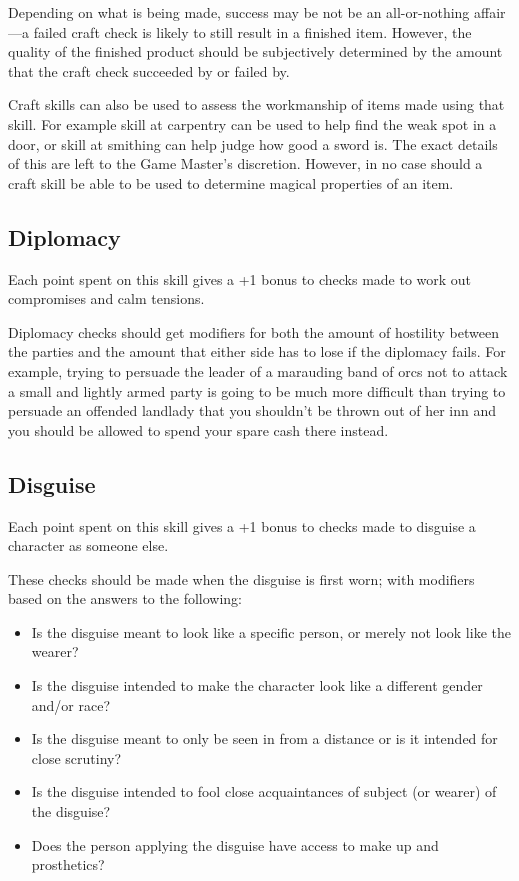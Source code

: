 \begin{multicols*}{2}
Depending on what is being made, success may be not be an all-or-nothing affair—a failed craft check is likely to still result in a finished item. However, the quality of the finished product should be subjectively determined by the amount that the craft check succeeded by or failed by.

Craft skills can also be used to assess the workmanship of items made using that skill. For example skill at carpentry can be used to help find the weak spot in a door, or skill at smithing can help judge how good a sword is. The exact details of this are left to the Game Master’s discretion. However, in no case should a craft skill be able to be used to determine magical properties of an item.

\subsection{Diplomacy}\label{skill:Diplomacy}
Each point spent on this skill gives a +1 bonus to  checks made to work out compromises and calm tensions.

Diplomacy checks should get modifiers for both the amount of hostility between the parties and the amount that either side has to lose if the diplomacy fails. For example, trying to persuade the leader of a marauding band of orcs not to attack a small and lightly armed party is going to be much more difficult than trying to persuade an offended landlady that you shouldn’t be thrown out of her inn and you should be allowed to spend your spare cash there instead.


\subsection{Disguise}\label{skill:Disguise}
Each point spent on this skill gives a +1 bonus to  checks made to disguise a character as someone else. 

These checks should be made when the disguise is first worn; with modifiers based on the answers to the following:

\begin{itemize}
	\item{Is the disguise meant to look like a specific person, or merely not look like the wearer?}
	\item{Is the disguise intended to make the character look like a different gender and/or race?}
	\item{Is the disguise meant to only be seen in from a distance or is it intended for close scrutiny?}
	\item{Is the disguise intended to fool close acquaintances of subject (or wearer) of the disguise?}
	\item{Does the person applying the disguise have access to make up and prosthetics?}
\end{itemize}


\end{multicols*}
